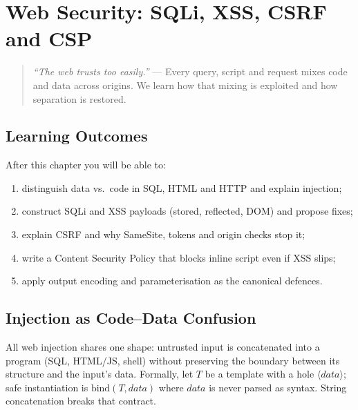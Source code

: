 \chapter{Web Security: SQLi, XSS, CSRF and CSP}
\label{ch:web}

\begin{quote}
\emph{``The web trusts too easily.''} --- Every query, script and request mixes code and data across origins. We learn how that mixing is exploited and how separation is restored.
\end{quote}

\noindent{}
\vspace{0.4em}

\section*{Learning Outcomes}
After this chapter you will be able to:
\begin{enumerate}[label=(L\arabic*)]
    \item distinguish data vs.\ code in SQL, HTML and HTTP and explain injection;
    \item construct SQLi and XSS payloads (stored, reflected, DOM) and propose fixes;
    \item explain CSRF and why SameSite, tokens and origin checks stop it;
    \item write a Content Security Policy that blocks inline script even if XSS slips;
    \item apply output encoding and parameterisation as the canonical defences.
\end{enumerate}

\section{Injection as Code--Data Confusion}
\label{sec:code-data}
All web injection shares one shape: untrusted input is concatenated into a program (SQL, HTML/JS, shell) without preserving the boundary between its structure and the input's data. Formally, let $T$ be a template with a hole $\langle data\rangle$; safe instantiation is $\text{bind}(T, data)$ where $data$ is never parsed as syntax. String concatenation breaks that contract.

